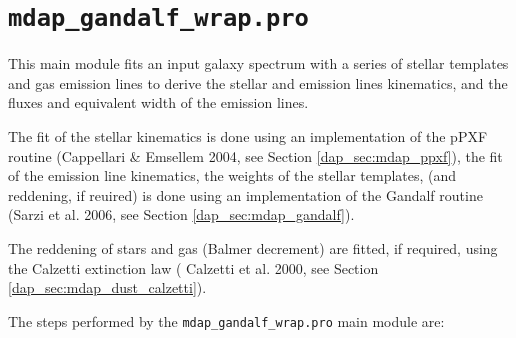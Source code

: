 \section{{\tt mdap\_gandalf\_wrap.pro}}
\label{dap_sec:mdap_gandalf_wrap}

This main module fits an input galaxy spectrum with a series of stellar
templates and gas emission lines to derive the stellar and emission
lines kinematics, and the fluxes and equivalent width of the emission
lines.

The fit of the stellar kinematics is done using an implementation of
the pPXF routine (Cappellari \& Emsellem 2004, see Section
\ref{dap_sec:mdap_ppxf}), the fit of the emission line kinematics, the
weights of the stellar templates, (and reddening, if reuired) is done
using an implementation of the Gandalf routine (Sarzi et al. 2006, see
Section \ref{dap_sec:mdap_gandalf}).

The reddening of stars and gas (Balmer decrement) are fitted, if
required, using the Calzetti extinction law ( Calzetti et al. 2000,
see Section \ref{dap_sec:mdap_dust_calzetti}).

The steps performed by the {\tt mdap\_gandalf\_wrap.pro} main module
are:


